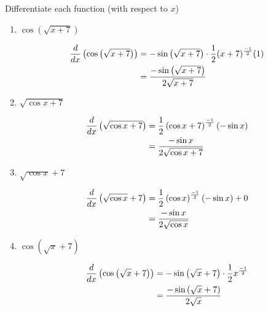 \documentclass[nooutcomes]{ximera}
\begin{document}
\begin{problem}
Differentiate each function (with respect to $x$)
	\begin{enumerate}
	
	\item  $\cos \left( \sqrt{x+7} \right) $
		\begin{freeResponse}
		\begin{align*}
		\frac{d}{dx} \left( \cos \left( \sqrt{x+7} \right) \right) &= -\sin \left( \sqrt{x+7} \right) \cdot \frac{1}{2} (x+7)^{\frac{-1}{2}} (1) \\
		&= \frac{-\sin \left( \sqrt{x+7} \right) }{2 \sqrt{x+7}}
		\end{align*}
		\end{freeResponse}
		
	\item  $\sqrt{ \cos x + 7}$
		\begin{freeResponse}
		\begin{align*}
		\frac{d}{dx} \left( \sqrt{ \cos x + 7} \right) &= \frac{1}{2} \left( \cos x + 7 \right)^{\frac{-1}{2}} \left( -\sin x \right) \\
		&= \frac{- \sin x }{2 \sqrt{\cos x + 7 }}
		\end{align*}
		\end{freeResponse}
		
	\item $\sqrt{\cos x} + 7$
		\begin{freeResponse}
		\begin{align*}
		\frac{d}{dx} \left( \sqrt{\cos x} + 7 \right) &=  \frac{1}{2} \left( \cos x \right)^{\frac{-1}{2}} \left( -\sin x \right) + 0  \\
		&= \frac{- \sin x}{2 \sqrt{\cos x}}
		\end{align*}
		\end{freeResponse}
		
	\item  $\cos \left( \sqrt{x} + 7 \right)$
		\begin{freeResponse}
		\begin{align*}
		\frac{d}{dx} \left( \cos \left( \sqrt{x} + 7 \right) \right) &= - \sin \left( \sqrt{x} + 7 \right) \cdot \frac{1}{2} x^{\frac{-1}{2}} \\
		&=  \frac{- \sin \left( \sqrt{x} + 7 \right) }{2 \sqrt{x}}
		\end{align*}
		\end{freeResponse}
	\end{enumerate}
		
		
		
		
\end{problem}
\end{document}
